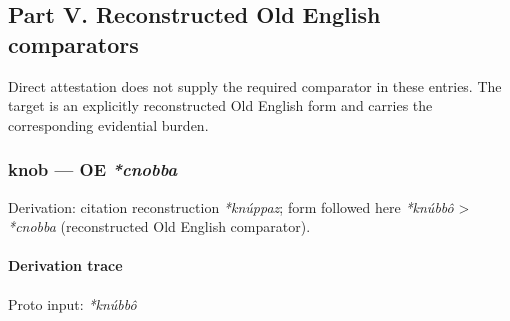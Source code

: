 \documentclass[
  british,
  a4paper,
]{article}
\begin{document}
\clearpage

\subsection{Part V. Reconstructed Old English
comparators}\label{part-v.-reconstructed-old-english-comparators}

Direct attestation does not supply the required comparator in these
entries. The target is an explicitly reconstructed Old English form and
carries the corresponding evidential burden.

\subsubsection{\texorpdfstring{knob --- OE
\emph{*cnobba}}{knob --- OE *cnobba}}\label{knob-oe-cnobba}

Derivation: citation reconstruction \emph{*knúppaz}; form followed here
\emph{*knúbbô} \textgreater{} \emph{*cnobba} (reconstructed Old English
comparator).

\paragraph{Derivation trace}\label{derivation-trace-150}

Proto input: \emph{*knúbbô}

\begingroup
\setlength{\fboxsep}{6pt}
\end{document}
